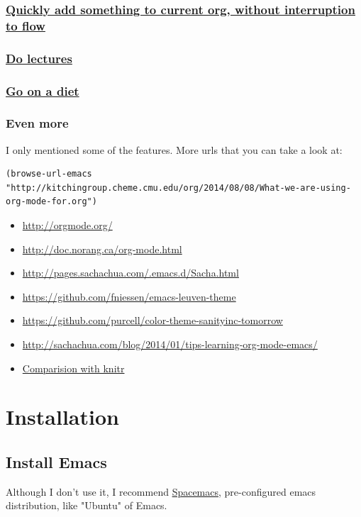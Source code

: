 \documentclass[11pt]{article}
\begin{document}
\subsubsection{\href{http://orgmode.org/manual/Capture.html#Capture}{Quickly add something to current org, without interruption to flow}}
\label{sec:orgheadline23}
\subsubsection{\href{https://www.youtube.com/watch?v=JZ8RK-R9O_g}{Do lectures}}
\label{sec:orgheadline24}
\subsubsection{\href{http://emacsporn.tumblr.com/post/4982654361/dieting-theres-an-org-mode-extension-for-that}{Go on a diet}}
\label{sec:orgheadline25}
\subsubsection{Even more}
\label{sec:orgheadline26}
I only mentioned some of the features. More urls that you can take a look at:

\begin{verbatim}
(browse-url-emacs "http://kitchingroup.cheme.cmu.edu/org/2014/08/08/What-we-are-using-org-mode-for.org")
\end{verbatim}
\begin{itemize}
\item \url{http://orgmode.org/}
\item \url{http://doc.norang.ca/org-mode.html}
\item \url{http://pages.sachachua.com/.emacs.d/Sacha.html}
\item \url{https://github.com/fniessen/emacs-leuven-theme}
\item \url{https://github.com/purcell/color-theme-sanityinc-tomorrow}
\item \url{http://sachachua.com/blog/2014/01/tips-learning-org-mode-emacs/}
\item \href{http://minimallysufficient.github.io/2015/10/24/org-mode-as-an-alternative-to-knitr.html}{Comparision with knitr}
\end{itemize}
\section{Installation}
\label{sec:orgheadline33}
\subsection{Install Emacs}
\label{sec:orgheadline29}
Although I don't use it, I recommend \href{http://spacemacs.org/}{Spacemacs}, pre-configured emacs distribution, like "Ubuntu" of Emacs.
\end{document}
